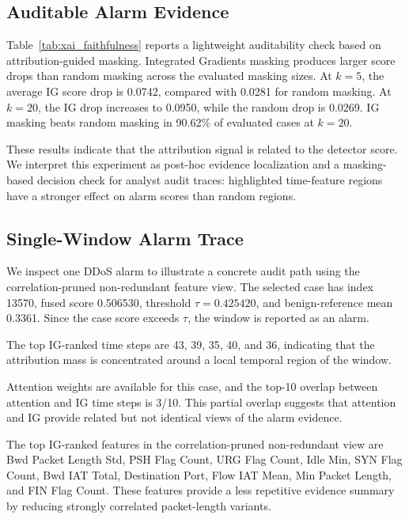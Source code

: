 

\subsection{Auditable Alarm Evidence}

Table~\ref{tab:xai_faithfulness} reports a lightweight auditability check based on attribution-guided masking. Integrated Gradients masking produces larger score drops than random masking across the evaluated masking sizes. At $k=5$, the average IG score drop is 0.0742, compared with 0.0281 for random masking. At $k=20$, the IG drop increases to 0.0950, while the random drop is 0.0269. IG masking beats random masking in 90.62\% of evaluated cases at $k=20$.

These results indicate that the attribution signal is related to the detector score. We interpret this experiment as post-hoc evidence localization and a masking-based decision check for analyst audit traces: highlighted time-feature regions have a stronger effect on alarm scores than random regions.



\subsection{Single-Window Alarm Trace}

We inspect one DDoS alarm to illustrate a concrete audit path using the correlation-pruned non-redundant feature view. The selected case has index 13570, fused score 0.506530, threshold \(\tau=0.425420\), and benign-reference mean 0.3361. Since the case score exceeds \(\tau\), the window is reported as an alarm.

The top IG-ranked time steps are 43, 39, 35, 40, and 36, indicating that the attribution mass is concentrated around a local temporal region of the window.

Attention weights are available for this case, and the top-10 overlap between attention and IG time steps is 3/10. This partial overlap suggests that attention and IG provide related but not identical views of the alarm evidence.

The top IG-ranked features in the correlation-pruned non-redundant view are Bwd Packet Length Std, PSH Flag Count, URG Flag Count, Idle Min, SYN Flag Count, Bwd IAT Total, Destination Port, Flow IAT Mean, Min Packet Length, and FIN Flag Count. These features provide a less repetitive evidence summary by reducing strongly correlated packet-length variants.

